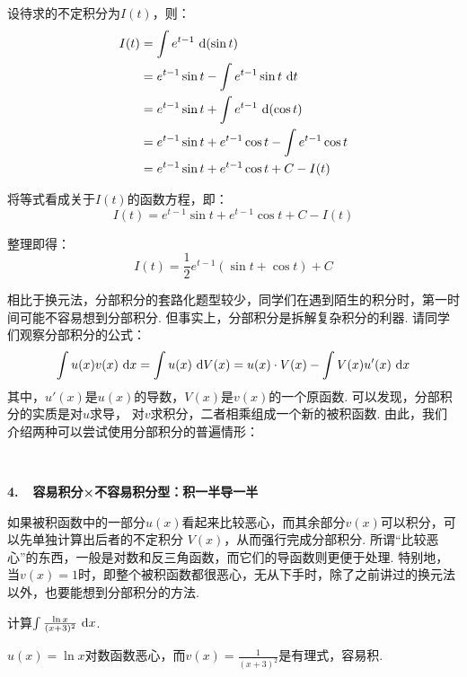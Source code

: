 \begin{solution}
设待求的不定积分为$I(t)$，则：
\begin{align*}
        I(t) &= \int e^{t-1} ~\mathrm{d}(\sin t) \\
        &= e^{t-1}\sin t - \int e^{t-1} \sin t ~\mathrm{d} t \\
        &= e^{t-1}\sin t +\int  e^{t-1} ~\mathrm{d} (\cos t) \\
        &= e^{t-1}\sin t +e^{t-1}\cos t -\int e^{t-1}\cos t \\
        &= e^{t-1}\sin t +e^{t-1}\cos t +C -I(t)
        \nonumber
\end{align*} \par
将等式看成关于$I(t)$的函数方程，即：
$$
I(t) = e^{t-1}\sin t +e^{t-1}\cos t +C -I(t)
$$

整理即得：
$$
I(t) = \frac{1}{2} e^{t-1} (\sin t + \cos t) + C
$$
\end{solution}

相比于换元法，分部积分的套路化题型较少，同学们在遇到陌生的积分时，第一时间可能不容易想到分部积分.
但事实上，分部积分是拆解复杂积分的利器. 请同学们观察分部积分的公式：
$$
\int u(x)v(x)~\mathrm{d} x = \int u(x)~\mathrm{d} V(x) =  u(x)\cdot V(x) - \int V(x) u'(x) ~\mathrm{d} x
$$
其中，$u'(x)$是$u(x)$的导数，$V(x)$是$v(x)$的一个原函数. 可以发现，分部积分的实质是对$u$求导，
对$v$求积分，二者相乘组成一个新的被积函数. 由此，我们介绍两种可以尝试使用分部积分的普遍情形：\par
~\par

\textbf{4.~~容易积分×不容易积分型：积一半导一半}\vspace{0.5em}

如果被积函数中的一部分$u(x)$看起来比较恶心，而其余部分$v(x)$可以积分，可以先单独计算出后者的不定积分
$V(x)$，从而强行完成分部积分. 所谓“比较恶心”的东西，一般是对数和反三角函数，而它们的导函数则更便于处理.
特别地，当$v(x)=1$时，即整个被积函数都很恶心，无从下手时，除了之前讲过的换元法以外，也要能想到分部积分的方法.

\begin{example}
\label{ex:ch03-23}
计算$\int \frac{\ln x}{(x+3)^2} ~\mathrm{d} x$.
\end{example}

\begin{analysis}
$u(x)=\ln x$对数函数恶心，而$v(x)=\frac{1}{(x+3)^2}$是有理式，容易积.
\end{analysis}

